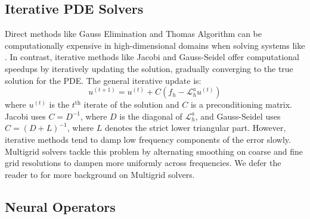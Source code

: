 \documentclass{article} %
\begin{document}
\subsection{Iterative PDE Solvers} \label{sec:finitedifference}
Direct methods like Gauss Elimination and Thomas Algorithm can be computationally expensive in high-dimensional domains when solving systems like .
In contrast, iterative methods like Jacobi and Gauss-Seidel offer computational speedups by iteratively updating the solution, gradually converging to the true solution for the PDE. The general iterative update is:
\begin{equation}\label{eq:iterativeupdate}
    u^{(t + 1)} = u^{(t)} + C\left(f_h - \mathcal{L}_h^au^{(t)}\right)
\end{equation}
where $u^{(t)}$ is the $t^{\text{th}}$ iterate of the solution and $C$ is a preconditioning matrix. Jacobi uses $C = D^{-1}$, where $D$ is the diagonal of $\mathcal{L}_h^a$, and Gauss-Seidel uses $C = (D + L)^{-1}$, where $L$ denotes the strict lower triangular part. 
However, iterative methods tend to damp low frequency components of the error slowly. Multigrid solvers \citep{briggs2000multigrid,trottenberg2001multigrid,hackbusch2013multi} 
tackle this problem by alternating smoothing
on coarse and fine grid resolutions to dampen more uniformly across frequencies. We defer the reader to  for more background on Multigrid solvers.





\subsection{Neural Operators} \label{sec:neuraloperators}
\end{document}

